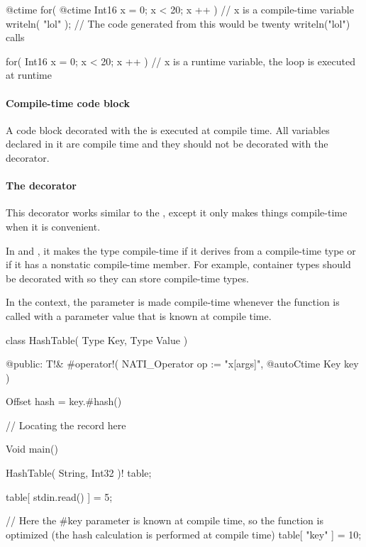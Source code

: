 \begin{code}
@ctime for( @ctime Int16 x = 0; x < 20; x ++ ) {
	// x is a compile-time variable
	writeln( "lol" );
	// The code generated from this would be twenty writeln("lol") calls
}

for( Int16 x = 0; x < 20; x ++ ) {
	// x is a runtime variable, the loop is executed at runtime	
}
\end{code}

\paragraph{Compile-time code block} A code block decorated with the  is executed at compile time. All variables declared in it are compile time and they should not be decorated with the  decorator.

\paragraph{The  decorator} \label{decorator:autoCtime} This decorator works similar to the , except it only makes things compile-time when it is convenient.

In  and , it makes the type compile-time if it derives from a compile-time type or if it has a nonstatic compile-time member. For example, container types should be decorated with  so they can store compile-time types.

In the  context, the parameter is made compile-time whenever the function is called with a parameter value that is known at compile time.
\begin{code}
class HashTable( Type Key, Type Value ) {

@public:
	T!& #operator!( NATI_Operator op := "x[args]", @autoCtime Key key ) {
		Offset hash = key.#hash() %
		
		// Locating the record here 
	}
	
}

Void main() {
	HashTable( String, Int32 )! table;
	
	table[ stdin.read() ] = 5;
	
	// Here the #key parameter is known at compile time, so the function is optimized (the hash calculation is performed at compile time)
	table[ "key" ] = 10;
}
\end{code}

